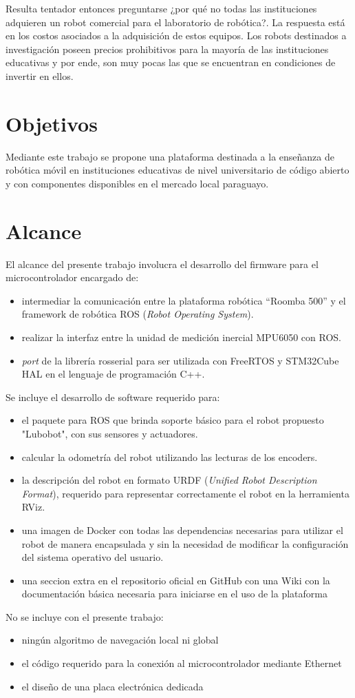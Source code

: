 Resulta tentador entonces preguntarse ¿por qué no todas las instituciones adquieren un robot comercial para el laboratorio de robótica?. La respuesta está en los costos asociados a la adquisición de estos equipos. Los robots destinados a investigación poseen precios prohibitivos para la mayoría de las instituciones educativas y por ende, son muy pocas las que se encuentran en condiciones de invertir en ellos.


\section{Objetivos}

Mediante este trabajo se propone una plataforma destinada a la enseñanza de robótica móvil en instituciones educativas de nivel universitario de código abierto y con componentes disponibles en el mercado local paraguayo.

\section{Alcance}

El alcance del presente trabajo involucra el desarrollo del firmware para el microcontrolador encargado de:
\begin{itemize}
	\item intermediar la comunicación entre la plataforma robótica ``Roomba 500'' y el framework de robótica ROS (\textit{Robot Operating System}).
	\item realizar la interfaz entre la unidad de medición inercial MPU6050 con ROS.
	\item \textit{port} de la librería rosserial para ser utilizada con FreeRTOS y STM32Cube HAL en el lenguaje de programación C++.
\end{itemize}

Se incluye el desarrollo de software requerido para:
\begin{itemize}
	\item el paquete para ROS que brinda soporte básico para el robot propuesto "Lubobot", con sus sensores y actuadores.
	\item calcular la odometría del robot utilizando las lecturas de los encoders.
	\item la descripción del robot en formato URDF (\textit{Unified Robot Description Format}), requerido para representar correctamente el robot en la herramienta RViz.
	\item una imagen de Docker con todas las dependencias necesarias para utilizar el robot de manera encapsulada y sin la necesidad de modificar la configuración del sistema operativo del usuario.
	\item una seccion extra en el repositorio oficial en GitHub con una Wiki con la documentación básica necesaria para iniciarse en el uso de la plataforma
\end{itemize}

\newpage

No se incluye con el presente trabajo:
\begin{itemize}
	\item ningún algoritmo de navegación local ni global
	\item el código requerido para la conexión al microcontrolador mediante Ethernet
	\item el diseño de una placa electrónica dedicada
\end{itemize}